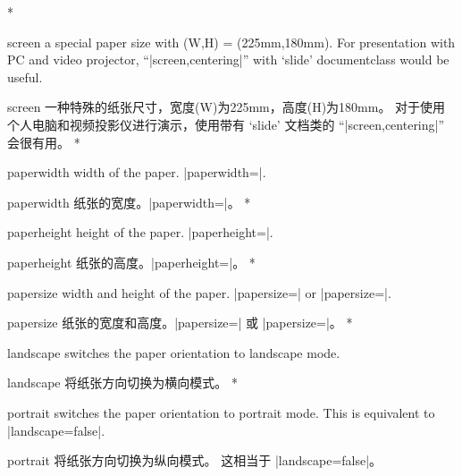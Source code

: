 \begin{Options}
\begin{paracol}{2}
\switchcolumn[0]*
\item[\onlypre screen] a special paper size with (W,H) = (225mm,180mm).
For presentation with PC and video projector, ``|screen,centering|''
with `slide' documentclass would be useful.
\switchcolumn
\item[\onlypre screen] 一种特殊的纸张尺寸，宽度(W)为225mm，高度(H)为180mm。
对于使用个人电脑和视频投影仪进行演示，使用带有 `slide' 文档类的 ``|screen,centering|'' 会很有用。
\switchcolumn[0]*
\item[\onlypre paperwidth] width of the paper. |paperwidth=|.
\switchcolumn
\item[\onlypre paperwidth] 纸张的宽度。|paperwidth=|。
\switchcolumn[0]*
\item[\onlypre paperheight] height of the paper. |paperheight=|.
\switchcolumn
\item[\onlypre paperheight] 纸张的高度。|paperheight=|。
\switchcolumn[0]*
\item[\onlypre papersize] width and height of the paper. 
    |papersize=| or |papersize=|.
\switchcolumn
\item[\onlypre papersize] 纸张的宽度和高度。|papersize=| 或 |papersize=|。
\switchcolumn[0]*
\item[\onlypre landscape] switches the paper orientation to landscape mode.
\switchcolumn
\item[\onlypre landscape] 将纸张方向切换为横向模式。
\switchcolumn[0]*
\item[\onlypre portrait] switches the paper orientation to portrait mode.
This is equivalent to |landscape=false|.
\switchcolumn
\item[\onlypre portrait] 将纸张方向切换为纵向模式。
这相当于 |landscape=false|。
\end{paracol}
\end{Options}

